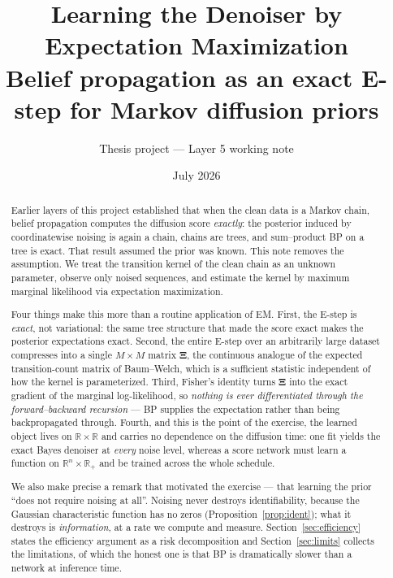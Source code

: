 \documentclass[11pt]{article}
\title{Learning the Denoiser by Expectation Maximization\\
\large Belief propagation as an exact E-step for Markov diffusion priors}
\author{Thesis project --- Layer 5 working note}
\date{July 2026}
\theoremstyle{remark}
\newcommand{\R}{\mathbb{R}}
\newcommand{\Xibf}{\bm{\Xi}}
\begin{document}
\maketitle

\begin{abstract}
Earlier layers of this project established that when the clean data is a Markov
chain, belief propagation computes the diffusion score \emph{exactly}: the
posterior induced by coordinatewise noising is again a chain, chains are trees,
and sum--product BP on a tree is exact. That result assumed the prior was known.
This note removes the assumption. We treat the transition kernel of the clean
chain as an unknown parameter, observe only noised sequences, and estimate the
kernel by maximum marginal likelihood via expectation maximization.

Four things make this more than a routine application of EM. First, the E-step
is \emph{exact}, not variational: the same tree structure that made the score
exact makes the posterior expectations exact. Second, the entire E-step over an
arbitrarily large dataset compresses into a single $M \times M$ matrix
$\Xibf$, the continuous analogue of the expected transition-count matrix of
Baum--Welch, which is a sufficient statistic independent of how the kernel is
parameterized. Third, Fisher's identity turns $\Xibf$ into the exact gradient of
the marginal log-likelihood, so \emph{nothing is ever differentiated through the
forward--backward recursion} --- BP supplies the expectation rather than being
backpropagated through. Fourth, and this is the point of the exercise, the
learned object lives on $\R \times \R$ and carries no dependence on the
diffusion time: one fit yields the exact Bayes denoiser at \emph{every} noise
level, whereas a score network must learn a function on $\R^n \times \R_+$ and
be trained across the whole schedule.

We also make precise a remark that motivated the exercise --- that learning the
prior ``does not require noising at all''. Noising never destroys
identifiability, because the Gaussian characteristic function has no zeros
(Proposition~\ref{prop:ident}); what it destroys is \emph{information}, at a
rate we compute and measure. Section~\ref{sec:efficiency} states the efficiency
argument as a risk decomposition and Section~\ref{sec:limits} collects the
limitations, of which the honest one is that BP is dramatically slower than a
network at inference time.
\end{abstract}

\tableofcontents
\end{document}
